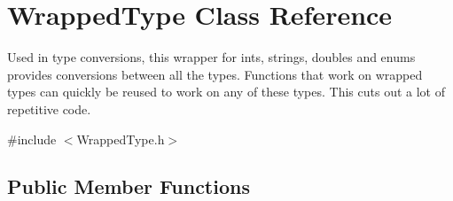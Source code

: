\hypertarget{class_wrapped_type}{}\section{Wrapped\+Type Class Reference}
\label{class_wrapped_type}


Used in type conversions, this wrapper for ints, strings, doubles and enums provides conversions between all the types. Functions that work on wrapped types can quickly be reused to work on any of these types. This cuts out a lot of repetitive code.  




{\ttfamily \#include $<$Wrapped\+Type.\+h$>$}

\subsection*{Public Member Functions}
